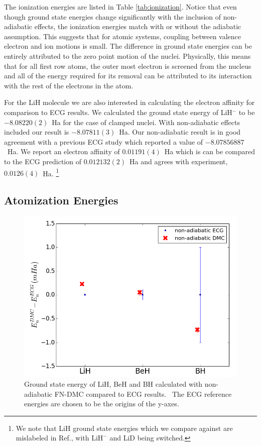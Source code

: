 \documentclass[pra,superscriptaddress,groupedaddress,twocolumn]{revtex4}
\begin{document}
The ionization energies are listed in Table \ref{tab:ionization}.  Notice that even though ground state energies change significantly with the inclusion of non-adiabatic effects, the ionization energies match with or without the adiabatic assumption. This suggests that for atomic systems, coupling between valence electron and ion motions is small. The difference in ground state energies can be entirely attributed to the zero point motion of the nuclei. Physically, this means that for all first row atoms, the outer most electron is screened from the nucleus and all of the energy required for its removal can be attributed to its interaction with the rest of the electrons in the atom.

For the LiH molecule we are also interested in calculating the electron affinity for comparison to ECG results. We calculated the ground state energy of LiH$^-$ to be $-8.08220(2)$~Ha for the case of clamped nuclei.  With non-adiabatic effects included our result is  $-8.07811(3)$~Ha. Our non-adiabatic result is in good agreement with a previous ECG study \cite{Bubin_LiH_noBO} which reported a value of $-8.07856887$~Ha. We report an electron affinity of $0.01191(4)$~Ha which is can be compared to the ECG prediction of $0.012132(2)$~Ha and agrees with experiment, $0.0126(4)$~Ha. \footnote{We note that LiH ground state energies which we compare against are mislabeled in Ref.\cite{Bubin_LiH_noBO}, with $\text{LiH}^-$ and LiD being switched.}



\subsection{Atomization Energies}

\begin{figure}
\centering
\includegraphics[scale=.4]{Figures/dia-ECG}
\caption{Ground state energy of LiH, BeH and BH calculated with non-adiabatic FN-DMC compared to ECG results.~\cite{Adamowicz_LiH,Koput_BeH,Miliordos_BH} The ECG reference energies are chosen to be the origins of the y-axes.}
\end{figure}
\end{document}
